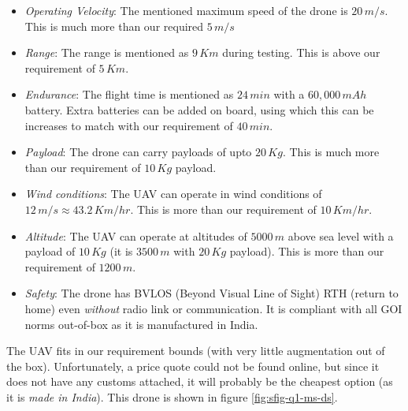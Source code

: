 \begin{itemize}
    \item \textit{Operating Velocity}: The mentioned maximum speed of the drone is $20\,m/s$. This is much more than our required $5\,m/s$
    \item \textit{Range}: The range is mentioned as $9\,Km$ during testing. This is above our requirement of $5\,Km$.
    \item \textit{Endurance}: The flight time is mentioned as $24\,min$ with a $60,000\,mAh$ battery. Extra batteries can be added on board, using which this can be increases to match with our requirement of $40\,min$.
    \item \textit{Payload}: The drone can carry payloads of upto $20\,Kg$. This is much more than our requirement of $10\,Kg$ payload.
    \item \textit{Wind conditions}: The UAV can operate in wind conditions of $12\,m/s \approx 43.2\,Km/hr$. This is more than our requirement of $10\,Km/hr$.
    \item \textit{Altitude}: The UAV can operate at altitudes of $5000\,m$ above sea level with a payload of $10\,Kg$ (it is $3500\,m$ with $20\,Kg$ payload). This is more than our requirement of $1200\,m$.
    \item \textit{Safety}: The drone has BVLOS (Beyond Visual Line of Sight) RTH (return to home) even \emph{without} radio link or communication. It is compliant with all GOI norms out-of-box as it is manufactured in India.
\end{itemize}

The UAV fits in our requirement bounds (with very little augmentation out of the box). Unfortunately, a price quote could not be found online, but since it does not have any customs attached, it will probably be the cheapest option (as it is \emph{made in India}). This drone is shown in figure \ref{fig:sfig-q1-ms-ds}.

